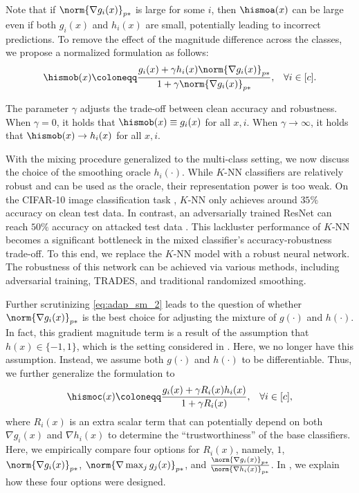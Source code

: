 \documentclass[11pt, letterpaper]{article}
\theoremstyle{plain}
\theoremstyle{definition}
\begin{document}
Note that if $\norm{\nabla g_i (x)}_{p*}$ is large for some $i$, then $\hismoa (x)$ can be large even if both $g_i (x)$ and $h_i (x)$ are small, potentially leading to incorrect predictions. To remove the effect of the magnitude difference across the classes, we propose a normalized formulation as follows:
\begin{equation} \label{eq:adap_sm_2}
    \hismob (x) \coloneqq \frac{g_i (x) + \gamma h_i (x) \norm{\nabla g_i (x)}_{p*}}{1 + \gamma \norm{\nabla g_i (x)}_{p*}}, \;\;\; \forall i \in [c].
\end{equation}

The parameter $\gamma$ adjusts the trade-off between clean accuracy and robustness. When $\gamma = 0$, it holds that $\hismob (x) \equiv g_i (x)$ for all $x, i$. When $\gamma \to \infty$, it holds that $\hismob (x) \to h_i (x)$ for all $x, i$.

With the mixing procedure generalized to the multi-class setting, we now discuss the choice of the smoothing oracle $h_i (\cdot)$. While $K$-NN classifiers are relatively robust and can be used as the oracle, their representation power is too weak. On the CIFAR-10 image classification task \cite{cifar10}, $K$-NN only achieves around $35 \%$ accuracy on clean test data. In contrast, an adversarially trained ResNet \citep{He16} can reach $50 \%$ accuracy on attacked test data \cite{Madry18}. This lackluster performance of $K$-NN becomes a significant bottleneck in the mixed classifier's accuracy-robustness trade-off. To this end, we replace the $K$-NN model with a robust neural network. The robustness of this network can be achieved via various methods, including adversarial training, TRADES, and traditional randomized smoothing.

Further scrutinizing \cref{eq:adap_sm_2} leads to the question of whether $\norm{\nabla g_i (x)}_{p*}$ is the best choice for adjusting the mixture of $g (\cdot)$ and $h (\cdot)$. In fact, this gradient magnitude term is a result of the assumption that $h (x) \in \{-1, 1\}$, which is the setting considered in \cite{Anderson21b}. Here, we no longer have this assumption. Instead, we assume both $g (\cdot)$ and $h (\cdot)$ to be differentiable. Thus, we further generalize the formulation to
\begin{gather} \label{eq:adap_sm_3}
    \hismoc (x) \coloneqq \frac{g_i(x) + \gamma R_i(x) h_i(x)}{1 + \gamma R_i(x)}, \;\;\; \forall i \in [c],
\end{gather}
where $R_i (x)$ is an extra scalar term that can potentially depend on both $\nabla g_i (x)$ and $\nabla h_i (x)$ to determine the ``trustworthiness'' of the base classifiers. Here, we empirically compare four options for $R_i (x)$, namely, $1$, $\norm{\nabla g_i (x)}_{p*}$, $\norm{\nabla \max_j g_j (x)}_{p*}$, and $\frac{\norm{\nabla g_i (x)}_{p*}} {\norm{\nabla h_i (x)}_{p*}}$. In , we explain how these four options were designed.
\end{document}
